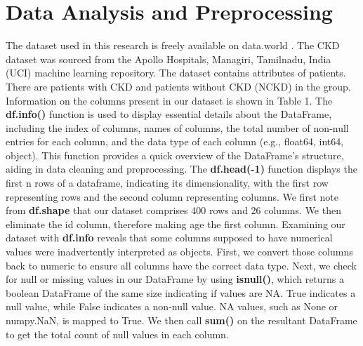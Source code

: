 \documentclass[conference]{IEEEtran}
\begin{document}
\section{Data Analysis and Preprocessing}
The dataset used in this research is freely available on data.world \cite{9}. The CKD dataset was sourced from the Apollo Hospitals, Managiri, Tamilnadu, India (UCI) machine learning repository. The dataset contains attributes of patients. There are patients with CKD and patients without CKD (NCKD) in the group. Information on the columns present in our dataset is shown in Table 1. The \textbf{df.info()} function is used to display essential details about the DataFrame, including the index of columns, names of columns, the total number of non-null entries for each column, and the data type of each column (e.g., float64, int64, object). This function provides a quick overview of the DataFrame's structure, aiding in data cleaning and preprocessing. The \textbf{df.head(-1)} function displays the first n rows of a dataframe, indicating its dimensionality, with the first row representing rows and the second column representing columns. We first note from \textbf{df.shape} that our dataset comprises 400 rows and 26 columns. We then eliminate the id column, therefore making age the first column. Examining our dataset with \textbf{df.info} reveals that some columns supposed to have numerical values were inadvertently interpreted as objects. First, we convert those columns back to numeric to ensure all columns have the correct data type. Next, we check for null or missing values in our DataFrame by using \textbf{isnull()}, which returns a boolean DataFrame of the same size indicating if values are NA. True indicates a null value, while False indicates a non-null value. NA values, such as None or numpy.NaN, is mapped to True. We then call \textbf{sum()} on the resultant DataFrame to get the total count of null values in each column.
\end{document}
